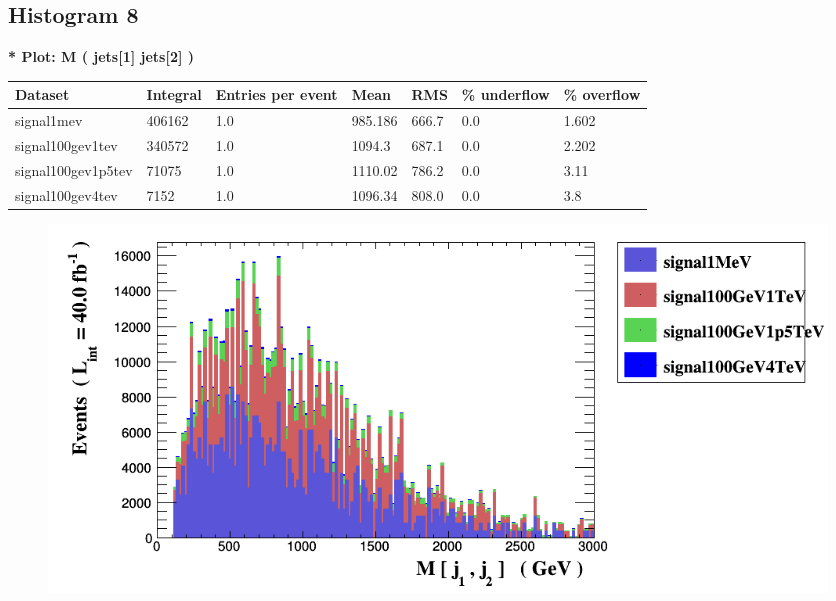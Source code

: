 \documentclass[a4paper, 10pt]{article}
\begin{document}
\subsection{ Histogram 8}

\textbf{* Plot: M ( jets[1] jets[2] ) }\\
   \begin{table}[H]
  \begin{center}
    \begin{tabular}{|m{23.0mm}|m{23.0mm}|m{18.0mm}|m{19.0mm}|m{19.0mm}|m{19.0mm}|m{19.0mm}|}
      \hline
      {\cellcolor{yellow}         Dataset}& {\cellcolor{yellow}         Integral}& {\cellcolor{yellow}         Entries per event}& {\cellcolor{yellow}         Mean}& {\cellcolor{yellow}         RMS}& {\cellcolor{yellow}         \% underflow}& {\cellcolor{yellow}         \% overflow}\\
      \hline
      {\cellcolor{white}         signal1mev}& {\cellcolor{white}         406162}& {\cellcolor{white}         1.0}& {\cellcolor{white}         985.186}& {\cellcolor{white}         666.7}& {\cellcolor{green}         0.0}& {\cellcolor{green}         1.602}\\
      \hline
      {\cellcolor{white}         signal100gev1tev}& {\cellcolor{white}         340572}& {\cellcolor{white}         1.0}& {\cellcolor{white}         1094.3}& {\cellcolor{white}         687.1}& {\cellcolor{green}         0.0}& {\cellcolor{green}         2.202}\\
      \hline
      {\cellcolor{white}         signal100gev1p5tev}& {\cellcolor{white}         71075}& {\cellcolor{white}         1.0}& {\cellcolor{white}         1110.02}& {\cellcolor{white}         786.2}& {\cellcolor{green}         0.0}& {\cellcolor{green}         3.11}\\
      \hline
      {\cellcolor{white}         signal100gev4tev}& {\cellcolor{white}         7152}& {\cellcolor{white}         1.0}& {\cellcolor{white}         1096.34}& {\cellcolor{white}         808.0}& {\cellcolor{green}         0.0}& {\cellcolor{green}         3.8}\\
\hline
    \end{tabular}
  \end{center}
\end{table}

\begin{figure}[H]
  \begin{center}
    \includegraphics[scale=0.45]{selection_7.png}\\
\caption{   }
  \end{center}
\end{figure}
      \newpage
\end{document}

